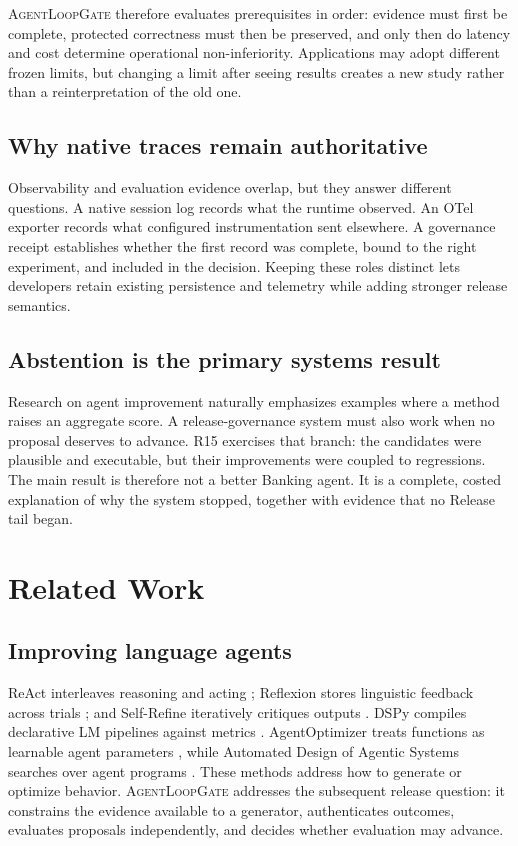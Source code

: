 \documentclass[10pt,twocolumn]{article}
\newcommand{\system}{\textsc{AgentLoopGate}\xspace}
\begin{document}
\system therefore evaluates prerequisites in order: evidence must first be
complete, protected correctness must then be preserved, and only then do
latency and cost determine operational non-inferiority. Applications may adopt
different frozen limits, but changing a limit after seeing results creates a
new study rather than a reinterpretation of the old one.

\subsection{Why native traces remain authoritative}

Observability and evaluation evidence overlap, but they answer different
questions. A native session log records what the runtime observed. An OTel
exporter records what configured instrumentation sent elsewhere. A governance
receipt establishes whether the first record was complete, bound to the right
experiment, and included in the decision. Keeping these roles distinct lets
developers retain existing persistence and telemetry while adding stronger
release semantics.

\subsection{Abstention is the primary systems result}

Research on agent improvement naturally emphasizes examples where a method
raises an aggregate score. A release-governance system must also work when no
proposal deserves to advance. R15 exercises that branch: the candidates were
plausible and executable, but their improvements were coupled to regressions.
The main result is therefore not a better Banking agent. It is a complete,
costed explanation of why the system stopped, together with evidence that no
Release tail began.

\section{Related Work}

\subsection{Improving language agents}

ReAct interleaves reasoning and acting \cite{yao2023react}; Reflexion stores
linguistic feedback across trials \cite{shinn2023reflexion}; and Self-Refine
iteratively critiques outputs \cite{madaan2023selfrefine}. DSPy compiles
declarative LM pipelines against metrics \cite{khattab2023dspy}.
AgentOptimizer treats functions as learnable agent parameters
\cite{zhang2024agentoptimizer}, while Automated Design of Agentic Systems
searches over agent programs \cite{hu2024adas}. These methods address how to
generate or optimize behavior. \system addresses the subsequent release
question: it constrains the evidence available to a generator, authenticates
outcomes, evaluates proposals independently, and decides whether evaluation
may advance.
\end{document}
